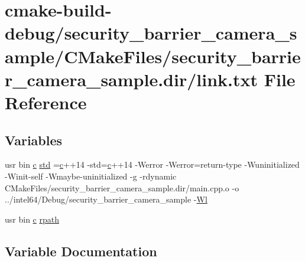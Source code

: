 \hypertarget{security__barrier__camera__sample_2CMakeFiles_2security__barrier__camera__sample_8dir_2link_8txt}{}\section{cmake-\/build-\/debug/security\+\_\+barrier\+\_\+camera\+\_\+sample/\+C\+Make\+Files/security\+\_\+barrier\+\_\+camera\+\_\+sample.dir/link.txt File Reference}
\label{security__barrier__camera__sample_2CMakeFiles_2security__barrier__camera__sample_8dir_2link_8txt}
\subsection*{Variables}
\begin{DoxyCompactItemize}
\item 
usr bin \hyperlink{CMakeCache_8txt_aac1d6a1710812201527c735f7c6afbaa}{c} \hyperlink{security__barrier__camera__sample_2CMakeFiles_2security__barrier__camera__sample_8dir_2link_8txt_a1ccfea5f558575a112db71eeb271fabf}{std} =\hyperlink{CMakeCache_8txt_aac1d6a1710812201527c735f7c6afbaa}{c}++14 -\/std=\hyperlink{CMakeCache_8txt_aac1d6a1710812201527c735f7c6afbaa}{c}++14 -\/Werror -\/Werror=return-\/type -\/Wuninitialized -\/Winit-\/self -\/Wmaybe-\/uninitialized -\/g -\/rdynamic C\+Make\+Files/security\+\_\+barrier\+\_\+camera\+\_\+sample.\+dir/main.\+cpp.\+o -\/o ../intel64/Debug/security\+\_\+barrier\+\_\+camera\+\_\+sample -\/\hyperlink{thirdparty_2extension_2CMakeFiles_2cpu__extension_8dir_2link_8txt_af9ccbf658ed2deb89d0d79f211e5b033}{Wl}
\item 
usr bin \hyperlink{CMakeCache_8txt_aac1d6a1710812201527c735f7c6afbaa}{c} \hyperlink{security__barrier__camera__sample_2CMakeFiles_2security__barrier__camera__sample_8dir_2link_8txt_ab9d7fd7120fafa2118a4e08c1df697c7}{rpath}
\end{DoxyCompactItemize}


\subsection{Variable Documentation}
